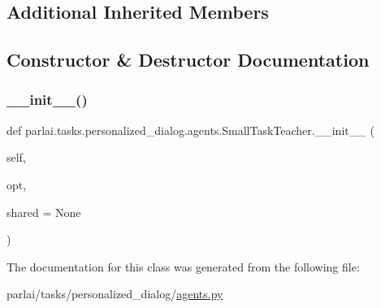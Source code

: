 \subsection*{Additional Inherited Members}


\subsection{Constructor \& Destructor Documentation}
\mbox{\label{classparlai_1_1tasks_1_1personalized__dialog_1_1agents_1_1SmallTaskTeacher_a2e707f17a77f97a8a04ee9737d627209}} 
\subsubsection{\texorpdfstring{\+\_\+\+\_\+init\+\_\+\+\_\+()}{\_\_init\_\_()}}
{\footnotesize\ttfamily def parlai.\+tasks.\+personalized\+\_\+dialog.\+agents.\+Small\+Task\+Teacher.\+\_\+\+\_\+init\+\_\+\+\_\+ (\begin{DoxyParamCaption}\item[{}]{self,  }\item[{}]{opt,  }\item[{}]{shared = {\ttfamily None} }\end{DoxyParamCaption})}



The documentation for this class was generated from the following file\+:\begin{DoxyCompactItemize}
\item 
parlai/tasks/personalized\+\_\+dialog/\hyperlink{parlai_2tasks_2personalized__dialog_2agents_8py}{agents.\+py}\end{DoxyCompactItemize}
